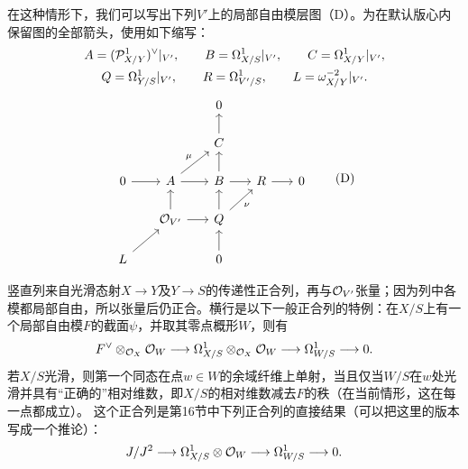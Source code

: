 在这种情形下，我们可以写出下列$V'$上的局部自由模层图（D）。为在默认版心内保留图的全部箭头，使用如下缩写：
\begin{gather*}
 A=(\mathcal P^1_{X/Y})^\vee|_{V'},\qquad B=\Omega^1_{X/S}|_{V'},
 \qquad C=\Omega^1_{X/Y}|_{V'},\\
 Q=\Omega^1_{Y/S}|_{V'},\qquad R=\Omega^1_{V'/S},
 \qquad L=\omega_{X/Y}^{-2}|_{V'}.
\end{gather*}
\[
\begin{tikzcd}[row sep=1.6em,column sep=1.7em]
 &&0\\
 &&C\arrow[u]\\
 0\arrow[r]&A\arrow[r]\arrow[ur,"\mu"]&B\arrow[u]\arrow[r]&R\arrow[r]&0\\
 &\Oa_{V'}\arrow[u]\arrow[r]&Q\arrow[u]\arrow[ur,"\nu"']\\
 L\arrow[ur]&&0\arrow[u]
\end{tikzcd}\tag{D}
\]


竖直列来自光滑态射$X\to Y$及$Y\to S$的传递性正合列，再与$\mathcal O_{V'}$张量；因为列中各模都局部自由，所以张量后仍正合。横行是以下一般正合列的特例：在$X/S$上有一个局部自由模$F$的截面$\psi$，并取其零点概形$W$，则有
\[
 F^\vee\otimes_{\mathcal O_X}\mathcal O_W\longrightarrow
 \Omega^1_{X/S}\otimes_{\mathcal O_X}\mathcal O_W\longrightarrow
 \Omega^1_{W/S}\longrightarrow0.
\]
若$X/S$光滑，则第一个同态在点$w\in W$的余域纤维上单射，当且仅当$W/S$在$w$处光滑并具有“正确的”相对维数，即$X/S$的相对维数减去$F$的秩（在当前情形，这在每一点都成立）。
这个正合列是第16节中下列正合列的直接结果（可以把这里的版本写成一个推论）：
\[
 J/J^2\longrightarrow\Omega^1_{X/S}\otimes\mathcal O_W
 \longrightarrow\Omega^1_{W/S}\longrightarrow0.
\]

